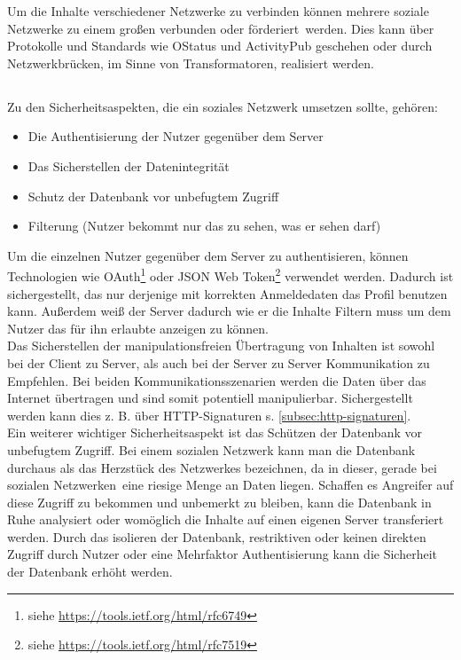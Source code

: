	Um die Inhalte verschiedener Netzwerke zu verbinden können mehrere soziale Netzwerke zu einem großen verbunden oder \glqq förderiert\grqq~werden. Dies kann über Protokolle und Standards wie OStatus und ActivityPub geschehen oder durch Netzwerkbrücken, im Sinne von Transformatoren, realisiert werden.\par
	\subsection{
	}
	Zu den Sicherheitsaspekten, die ein soziales Netzwerk umsetzen sollte, gehören:
	\begin{itemize}
		\item Die Authentisierung der Nutzer gegenüber dem Server
		\item Das Sicherstellen der Datenintegrität
		\item Schutz der Datenbank vor unbefugtem Zugriff
		\item Filterung (Nutzer bekommt nur das zu sehen, was er sehen darf)
	\end{itemize}
	Um die einzelnen Nutzer gegenüber dem Server zu authentisieren, können Technologien wie OAuth\footnote{siehe \url{https://tools.ietf.org/html/rfc6749}} oder JSON Web Token\footnote{siehe \url{https://tools.ietf.org/html/rfc7519}} verwendet werden. Dadurch ist sichergestellt, das nur derjenige mit korrekten Anmeldedaten das Profil benutzen kann. Außerdem weiß der Server dadurch wie er die Inhalte Filtern muss um dem Nutzer das für ihn erlaubte anzeigen zu können.\\
	
	Das Sicherstellen der manipulationsfreien Übertragung von Inhalten ist sowohl bei der Client zu Server, als auch bei der Server zu Server Kommunikation zu Empfehlen. Bei beiden Kommunikationsszenarien werden die Daten über das Internet übertragen und sind somit potentiell manipulierbar. Sichergestellt werden kann dies z. B. über HTTP-Signaturen s. \ref{subsec:http-signaturen}.\\
	
	Ein weiterer wichtiger Sicherheitsaspekt ist das Schützen der Datenbank vor unbefugtem Zugriff. Bei einem sozialen Netzwerk kann man die Datenbank durchaus als das Herzstück des Netzwerkes bezeichnen, da in dieser, gerade bei \glqq sozialen Netzwerken\grqq~eine riesige Menge an Daten liegen. Schaffen es Angreifer auf diese Zugriff zu bekommen und unbemerkt zu bleiben, kann die Datenbank in Ruhe analysiert oder womöglich die Inhalte auf einen eigenen Server transferiert werden. Durch das isolieren der Datenbank, restriktiven oder keinen direkten Zugriff durch Nutzer oder eine Mehrfaktor Authentisierung kann die Sicherheit der Datenbank erhöht werden.
